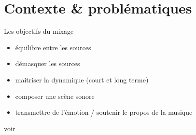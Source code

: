 \documentclass[9pt, aspectratio=169]{beamer}
\begin{document}
\section{Contexte \& problématiques}

\begin{frame}{Les objectifs du mixage} %

\pause
\begin{itemize}
	\item équilibre entre les sources
	\item démasquer les sources
	\item maitriser la dynamique (court et long terme)
	\item composer une scène sonore
	\item transmettre de l'émotion / soutenir le propos de la musique
\end{itemize}
voir \cite{owsinski_mixing_2013}
\end{frame}
\end{document}
